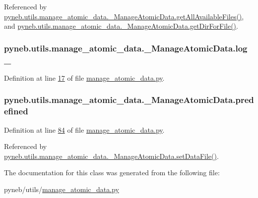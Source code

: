 Referenced by \hyperlink{manage__atomic__data_8py_source_l00190}{pyneb.\+utils.\+manage\+\_\+atomic\+\_\+data.\+\_\+\+Manage\+Atomic\+Data.\+get\+All\+Available\+Files()}, and \hyperlink{manage__atomic__data_8py_source_l00144}{pyneb.\+utils.\+manage\+\_\+atomic\+\_\+data.\+\_\+\+Manage\+Atomic\+Data.\+get\+Dir\+For\+File()}.

\hypertarget{classpyneb_1_1utils_1_1manage__atomic__data_1_1___manage_atomic_data_a1d8277ab92e8bac3e52ade094ba63773}{}
\subsubsection[{log\+\_\+}]{\setlength{\rightskip}{0pt plus 5cm}pyneb.\+utils.\+manage\+\_\+atomic\+\_\+data.\+\_\+\+Manage\+Atomic\+Data.\+log\+\_\+}\label{classpyneb_1_1utils_1_1manage__atomic__data_1_1___manage_atomic_data_a1d8277ab92e8bac3e52ade094ba63773}


Definition at line \hyperlink{manage__atomic__data_8py_source_l00017}{17} of file \hyperlink{manage__atomic__data_8py_source}{manage\+\_\+atomic\+\_\+data.\+py}.

\hypertarget{classpyneb_1_1utils_1_1manage__atomic__data_1_1___manage_atomic_data_a42d17444c105bd5238ae202a722ecb47}{}
\subsubsection[{predefined}]{\setlength{\rightskip}{0pt plus 5cm}pyneb.\+utils.\+manage\+\_\+atomic\+\_\+data.\+\_\+\+Manage\+Atomic\+Data.\+predefined}\label{classpyneb_1_1utils_1_1manage__atomic__data_1_1___manage_atomic_data_a42d17444c105bd5238ae202a722ecb47}


Definition at line \hyperlink{manage__atomic__data_8py_source_l00084}{84} of file \hyperlink{manage__atomic__data_8py_source}{manage\+\_\+atomic\+\_\+data.\+py}.



Referenced by \hyperlink{manage__atomic__data_8py_source_l00380}{pyneb.\+utils.\+manage\+\_\+atomic\+\_\+data.\+\_\+\+Manage\+Atomic\+Data.\+set\+Data\+File()}.



The documentation for this class was generated from the following file\+:\begin{DoxyCompactItemize}
\item 
pyneb/utils/\hyperlink{manage__atomic__data_8py}{manage\+\_\+atomic\+\_\+data.\+py}\end{DoxyCompactItemize}
